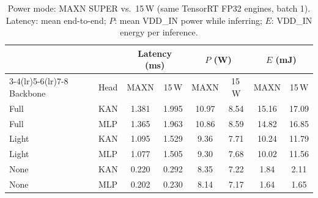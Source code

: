 \begin{table}[t]
\centering
\caption{Power mode: MAXN SUPER vs.\ 15\,W (same TensorRT FP32 engines, batch 1). Latency: mean end-to-end; $P$: mean VDD\_IN power while inferring; $E$: VDD\_IN energy per inference.}
\label{tab:powermodes}
\setlength{\tabcolsep}{3pt}
\small
\begin{tabular}{llcccccc}
\toprule
 & & \multicolumn{2}{c}{Latency (ms)} & \multicolumn{2}{c}{$P$ (W)} & \multicolumn{2}{c}{$E$ (mJ)} \\
\cmidrule(lr){3-4}\cmidrule(lr){5-6}\cmidrule(lr){7-8}
Backbone & Head & MAXN & 15\,W & MAXN & 15\,W & MAXN & 15\,W \\
\midrule
Full & KAN & 1.381 & 1.995 & 10.97 & 8.54 & 15.16 & 17.09 \\
Full & MLP & 1.365 & 1.963 & 10.86 & 8.59 & 14.82 & 16.85 \\
Light & KAN & 1.095 & 1.529 & 9.36 & 7.71 & 10.24 & 11.79 \\
Light & MLP & 1.077 & 1.505 & 9.30 & 7.68 & 10.02 & 11.56 \\
None & KAN & 0.220 & 0.292 & 8.35 & 7.22 & 1.84 & 2.11 \\
None & MLP & 0.202 & 0.230 & 8.14 & 7.17 & 1.64 & 1.65 \\
\bottomrule
\end{tabular}
\end{table}